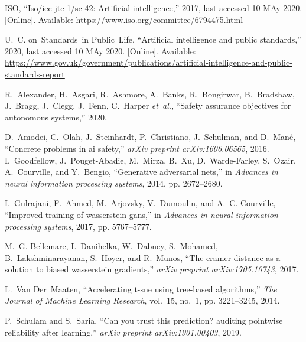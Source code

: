 \documentclass{article}
\begin{document}
\begin{thebibliography}{10}
\BIBentryALTinterwordspacing
ISO, ``Iso/iec jtc 1/sc 42: Artificial intelligence,'' 2017, last accessed 10
  MAy 2020. [Online]. Available:
  \url{https://www.iso.org/committee/6794475.html}
\BIBentrySTDinterwordspacing

\BIBentryALTinterwordspacing
U.~C. on~Standards~in Public~Life, ``Artificial intelligence and public
  standards,'' 2020, last accessed 10 MAy 2020. [Online]. Available:
  \url{https://www.gov.uk/government/publications/artificial-intelligence-and-public-standards-report}
  
R.~Alexander, H.~Asgari, R.~Ashmore, A.~Banks, R.~Bongirwar, B.~Bradshaw,
  J.~Bragg, J.~Clegg, J.~Fenn, C.~Harper \emph{et~al.}, ``Safety assurance
  objectives for autonomous systems,'' 2020.



D.~Amodei, C.~Olah, J.~Steinhardt, P.~Christiano, J.~Schulman, and D.~Man{\'e},
  ``Concrete problems in ai safety,'' \emph{arXiv preprint arXiv:1606.06565},
  2016.
I.~Goodfellow, J.~Pouget-Abadie, M.~Mirza, B.~Xu, D.~Warde-Farley, S.~Ozair,
  A.~Courville, and Y.~Bengio, ``Generative adversarial nets,'' in
  \emph{Advances in neural information processing systems}, 2014, pp.
  2672--2680.
  
I.~Gulrajani, F.~Ahmed, M.~Arjovsky, V.~Dumoulin, and A.~C. Courville,
  ``Improved training of wasserstein gans,'' in \emph{Advances in neural
  information processing systems}, 2017, pp. 5767--5777.



\BIBentrySTDinterwordspacing





M.~G. Bellemare, I.~Danihelka, W.~Dabney, S.~Mohamed, B.~Lakshminarayanan,
  S.~Hoyer, and R.~Munos, ``The cramer distance as a solution to biased
  wasserstein gradients,'' \emph{arXiv preprint arXiv:1705.10743}, 2017.



L.~Van Der~Maaten, ``Accelerating t-sne using tree-based algorithms,''
  \emph{The Journal of Machine Learning Research}, vol.~15, no.~1, pp.
  3221--3245, 2014.
  
P.~Schulam and S.~Saria, ``Can you trust this prediction? auditing pointwise
  reliability after learning,'' \emph{arXiv preprint arXiv:1901.00403}, 2019.
  

\end{thebibliography}
\end{document}
